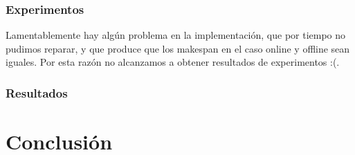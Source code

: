 \documentclass[12pt,letterpaper]{article}
\begin{document}
\subsubsection{Experimentos}
Lamentablemente hay algún problema en la implementación, que por tiempo no pudimos reparar, y que produce que los makespan en el caso online y offline sean iguales. Por esta razón no alcanzamos a obtener resultados de experimentos :(.

\subsubsection{Resultados}

\section{Conclusión}

\end{document}
